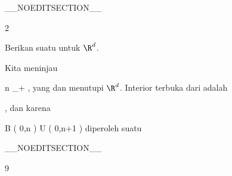 __NOEDITSECTION__

{2}

{

Berikan suatu
untuk $\R^d$.

}
{

Kita meninjau

 {}
 {n \in \N_+} {}
 {} {} {} {,}
yang
dan menutupi $\R^d$. Interior terbuka dari
adalah

, dan karena

\mavergleichskettedisp
{\vergleichskette
{ B  \left(  0,n \right)
}
{ \subseteq} { U \left(   0,n+1  \right)
}
{ } {
}
{ } {
}
{ } {
}
}
{}{}{}
diperoleh suatu

 }

__NOEDITSECTION__

{9}

